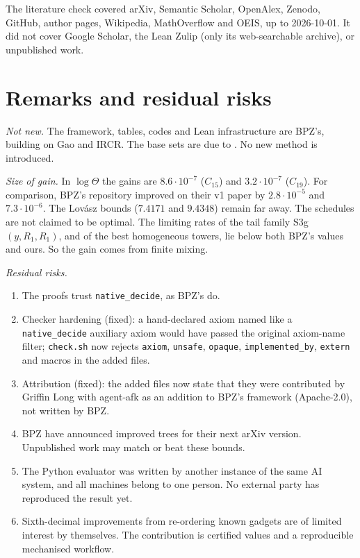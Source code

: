 \documentclass[11pt]{amsart}
\newcommand{\T}{\Theta}
\newcommand{\code}[1]{\texttt{#1}}
\begin{document}
The literature check covered arXiv, Semantic Scholar, OpenAlex, Zenodo, GitHub, author pages,
Wikipedia, MathOverflow and OEIS, up to 2026-10-01. It did not cover Google Scholar, the Lean
Zulip (only its web-searchable archive), or unpublished work.

\section{Remarks and residual risks}\label{sec:remarks}

\emph{Not new.} The framework, tables, codes and Lean infrastructure are BPZ's, building on Gao
and IRCR. The base sets are due to \cite{BMR,CGR,dBBZ}. No new method is introduced.

\emph{Size of gain.} In $\log\T$ the gains are $8.6\cdot10^{-7}$ ($C_{15}$) and $3.2\cdot10^{-7}$
($C_{19}$). For comparison, BPZ's repository improved on their v1 paper by $2.8\cdot10^{-5}$ and
$7.3\cdot10^{-6}$. The Lovász bounds ($7.4171$ and $9.4348$) remain far away. The schedules are
not claimed to be optimal. The limiting rates of the tail family S3g$(y,R_1,R_1)$, and of the
best homogeneous towers, lie below both BPZ's values and ours. So the gain comes from finite
mixing.

\emph{Residual risks.}
\begin{enumerate}
\item The proofs trust \code{native\_decide}, as BPZ's do.
\item Checker hardening (fixed): a hand-declared axiom named like a \code{native\_decide}
auxiliary axiom would have passed the original axiom-name filter; \code{check.sh} now rejects
\code{axiom}, \code{unsafe}, \code{opaque}, \code{implemented\_by}, \code{extern} and macros in the
added files.
\item Attribution (fixed): the added files now state that they were contributed by Griffin Long
with agent-afk as an addition to BPZ's framework (Apache-2.0), not written by BPZ.
\item BPZ have announced improved trees for their next arXiv version. Unpublished work may match
or beat these bounds.
\item The Python evaluator was written by another instance of the same AI system, and all
machines belong to one person. No external party has reproduced the result yet.
\item Sixth-decimal improvements from re-ordering known gadgets are of limited interest by
themselves. The contribution is certified values and a reproducible mechanised workflow.
\end{enumerate}
\end{document}
